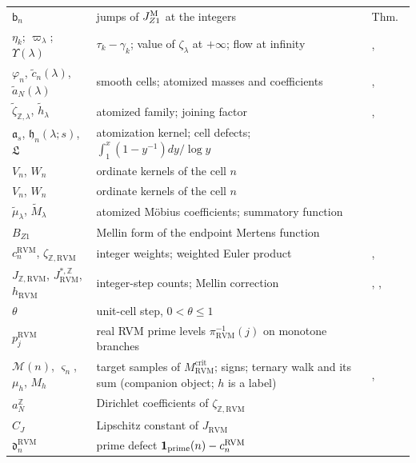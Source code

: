 \documentclass[11pt,reqno]{amsart}
\makeatletter
\let\CG@origref\ref
\let\CG@origeqref\eqref
\newcommand{\CG@gettip}[1]{\@ifundefined{CGTip@#1}{Reference: #1}{\csname CGTip@#1\endcsname}}
\DeclareRobustCommand{\CGref}[1]{\pdftooltip{\CG@origref{#1}}{\CG@gettip{#1}}}
\DeclareRobustCommand{\CGeqref}[1]{\pdftooltip{\CG@origeqref{#1}}{\CG@gettip{#1}}}
\numberwithin{equation}{section}
\theoremstyle{plain}
\theoremstyle{definition}
\theoremstyle{remark}
\newcommand{\Z}{\mathbb Z}
\newcommand{\RVM}{\mathrm{RVM}}
\newcommand{\crit}{\mathrm{crit}}
\makeatother
\begin{document}
{\begin{longtable}{>{\raggedright\arraybackslash}p{}>{\raggedright\arraybackslash}p{}>{\raggedright\arraybackslash}p{}}
$\mathsf b_n$ & jumps of $J_{Z1}^{\rm M}$ at the integers & Thm.~\CGref{thm:cell-form}\\
$\eta_k$; $\varpi_\lambda$; $\Upsilon(\lambda)$ & $\tau_k-\gamma_k$; value of $\zeta_\lambda$ at $+\infty$; flow at infinity & \CGeqref{eq:varpi-lambda}, \CGeqref{eq:Upsilon}\\
$\varphi_n$, $\tilde c_n(\lambda)$, $\tilde a_N(\lambda)$ & smooth cells; atomized masses and coefficients & \CGeqref{eq:atomized-family}, \CGeqref{eq:atomized-coefficients}\\
$\tilde\zeta_{\Z,\lambda}$, $\tilde h_\lambda$ & atomized family; joining factor & \CGeqref{eq:atomized-family}, \CGeqref{eq:joining-factor}\\
$\mathfrak a_s$, $\mathfrak h_n(\lambda;s)$, $\mathfrak L$ & atomization kernel; cell defects; $\int_1^x(1-y^{-1})dy/\log y$ & \CGeqref{eq:atomization-kernel}\\
$V_n$, $W_n$ & ordinate kernels of the cell $n$ & \CGeqref{eq:VW}\\
$V_n$, $W_n$ & ordinate kernels of the cell $n$ & \CGeqref{eq:VW}\\
$\tilde\mu_\lambda$, $\tilde M_\lambda$ & atomized M\"obius coefficients; summatory function & \CGeqref{eq:atomized-mobius}\\
$B_{Z1}$ & Mellin form of the endpoint Mertens function & \CGeqref{eq:Mellin-Mertens}\\
$c_n^{\RVM}$, $\zeta_{\Z,\RVM}$ & integer weights; weighted Euler product & \CGeqref{eq:cn}, \CGeqref{eq:weighted-zeta}\\
$J_{\Z,\RVM}$, $J_{\RVM}^{*,\Z}$, $h_{\RVM}$ & integer-step counts; Mellin correction & \CGeqref{eq:JZ}, \CGeqref{eq:J-star-Z}, \CGeqref{eq:hRVM}\\
$\theta$ & unit-cell step, $0<\theta\le1$ & \CGeqref{eq:unit-cell}\\
$p_j^{\RVM}$ & real RVM prime levels $\pi_{\RVM}^{-1}(j)$ on monotone branches & \CGeqref{eq:intro-real-primes}\\
$\mathcal M(n)$, $\varsigma_n$, $\mu_h$, $M_h$ & target samples of $M_{\RVM}^{\crit}$; signs; ternary walk and its sum (companion object; $h$ is a label) & \CGeqref{eq:intro-muh}, \CGeqref{eq:intro-quantizer}\\
$a_N^{\Z}$ & Dirichlet coefficients of $\zeta_{\Z,\RVM}$ & \CGeqref{eq:ZRVM-Dirichlet}\\
$C_J$ & Lipschitz constant of $J_{\RVM}$ & \CGeqref{eq:unit-cell}\\
$\mathfrak d_n^{\RVM}$ & prime defect $\mathbf 1_{\rm prime}(n)-c_n^{\RVM}$ & \CGeqref{eq:prime-defect}\\

\end{longtable}}
\end{document}
